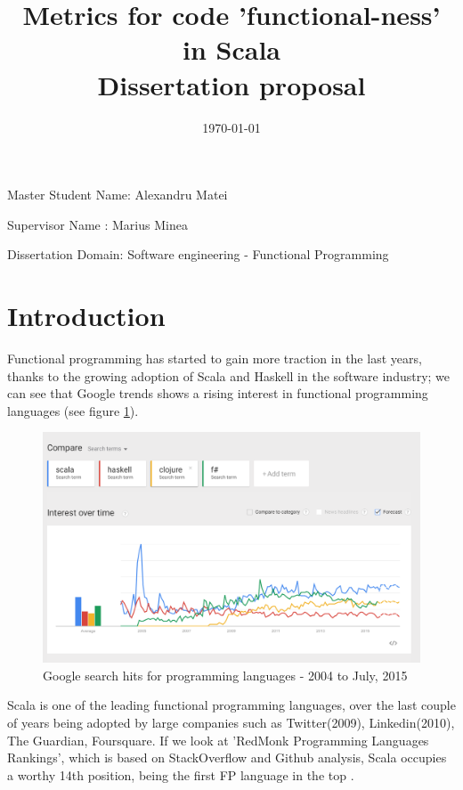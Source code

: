 \documentclass{article}
\title{Metrics for code 'functional-ness' in Scala\\Dissertation proposal  }
\date{\today}
\begin{document}
\maketitle

\vspace{30mm} %

\begin{center}
Master Student Name: Alexandru Matei \par
Supervisor Name : Marius Minea \par
Dissertation Domain: Software engineering - Functional Programming
\end{center}

\vfill

\newpage
\tableofcontents
\newpage

\section{Introduction}
Functional programming has started to gain more traction in the last years, thanks to the growing adoption of Scala and Haskell in the software industry; we can see that Google trends shows a rising interest in functional programming languages (see figure \ref{fig:google-rank}). \par

\begin{figure}[h!]
  \includegraphics[width=\linewidth]{google-trends.png}
  \caption{Google search hits for programming languages - 2004 to July, 2015 }
  \label{fig:google-rank}
\end{figure}

Scala is one of the leading functional programming languages, over the last couple of years being adopted by large companies such as  Twitter(2009), Linkedin(2010), The Guardian, Foursquare. If we look at 'RedMonk Programming Languages Rankings'\cite{redmonk:1}, which is based on StackOverflow and Github analysis,  Scala occupies a worthy 14th position, being the first FP language in the top . \par
\end{document}
